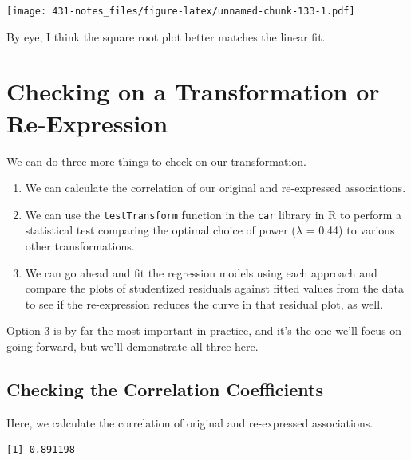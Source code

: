 \documentclass[
]{book}
\newenvironment{Shaded}{\begin{snugshade}}{\end{snugshade}}
\newcommand{\KeywordTok}[1]{\textcolor[rgb]{0.13,0.29,0.53}{\textbf{#1}}}
\newcommand{\NormalTok}[1]{#1}
\newcommand{\OperatorTok}[1]{\textcolor[rgb]{0.81,0.36,0.00}{\textbf{#1}}}
\providecommand{\tightlist}{%
  \setlength{\itemsep}{0pt}\setlength{\parskip}{0pt}}
\begin{document}
\texttt{[image: 431-notes\_files/figure-latex/unnamed-chunk-133-1.pdf]}

By eye, I think the square root plot better matches the linear fit.

\hypertarget{checking-on-a-transformation-or-re-expression}{%
\section{Checking on a Transformation or Re-Expression}\label{checking-on-a-transformation-or-re-expression}}

We can do three more things to check on our transformation.

\begin{enumerate}
\def\labelenumi{\arabic{enumi}.}
\tightlist
\item
  We can calculate the correlation of our original and re-expressed associations.
\item
  We can use the \texttt{testTransform} function in the \texttt{car} library in R to perform a statistical test comparing the optimal choice of power (\(\lambda\) = 0.44) to various other transformations.
\item
  We can go ahead and fit the regression models using each approach and compare the plots of studentized residuals against fitted values from the data to see if the re-expression reduces the curve in that residual plot, as well.
\end{enumerate}

Option 3 is by far the most important in practice, and it's the one we'll focus on going forward, but we'll demonstrate all three here.

\hypertarget{checking-the-correlation-coefficients}{%
\subsection{Checking the Correlation Coefficients}\label{checking-the-correlation-coefficients}}

Here, we calculate the correlation of original and re-expressed associations.

\begin{Shaded}
\end{Shaded}

\begin{verbatim}
[1] 0.891198
\end{verbatim}
\end{document}

